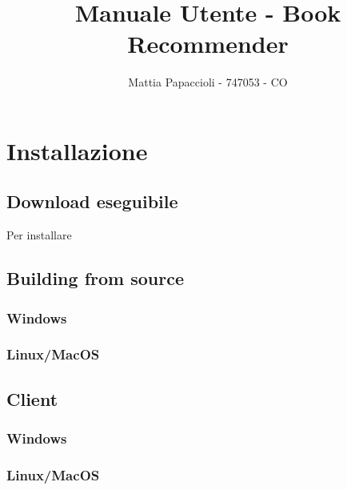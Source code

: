 \documentclass{report}
\title{Manuale Utente - Book Recommender}
\author{Mattia Papaccioli - 747053 - CO}
\begin{document}
\maketitle

\tableofcontents

\section{Installazione}
\subsection{Download eseguibile}
Per installare 

\subsection{Building from source}
\subsubsection{Windows}
\subsubsection{Linux/MacOS}

\subsection{Client}
\subsubsection{Windows}
\subsubsection{Linux/MacOS}
\end{document}
